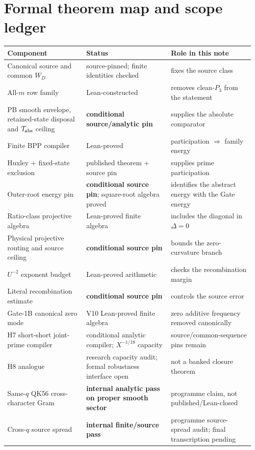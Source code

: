 \documentclass[11pt]{article}
\theoremstyle{definition}
\newcommand{\1}{\mathbf 1}
\begin{document}
\section{Formal theorem map and scope ledger}
\label{app:formal-map}
\begin{center}
\begin{tabular}{p{} p{} p{}}
\toprule
Component & Status & Role in this note\\
\midrule
Canonical source and common $W_D$ & source-pinned; finite identities checked & fixes the source class\\
All-$m$ row family & Lean-constructed & removes clean-$P_3$ from the statement\\
PB smooth envelope, retained-state disposal and $\mathcal T_{\rm abs}$ ceiling & \textbf{conditional source/analytic pin} & supplies the absolute comparator\\
Finite BPP compiler & Lean-proved & participation $\Rightarrow$ family energy\\
Huxley + fixed-state exclusion & published theorem + source pin & supplies prime participation\\
Outer-root energy pin & \textbf{conditional source pin}; square-root algebra proved & identifies the abstract energy with the Gate energy\\
Ratio-class projective algebra & Lean-proved finite algebra & includes the diagonal in $\Delta=0$\\
Physical projective routing and source ceiling & \textbf{conditional source pin} & bounds the zero-curvature branch\\
$U^{-2}$ exponent budget & Lean-proved arithmetic & checks the recombination margin\\
Literal recombination estimate & \textbf{conditional source pin} & controls the source error\\
Gate-1B canonical zero mode & V10 Lean-proved finite algebra & zero additive frequency removed canonically\\
H7 short-short joint-prime compiler & conditional analytic compiler; $X^{-1/18}$ capacity & source/common-sequence pins remain\\
H8 analogue & research capacity audit; formal robustness interface open & not a banked closure theorem\\
Same-$q$ QK56 cross-character Gram & \textbf{internal analytic pass on proper smooth sector} & programme claim, not published/Lean-closed\\
Cross-$q$ source spread & \textbf{internal finite/source pass} & programme source-spread audit; final transcription pending\\

\end{tabular}
\end{center}
\end{document}

